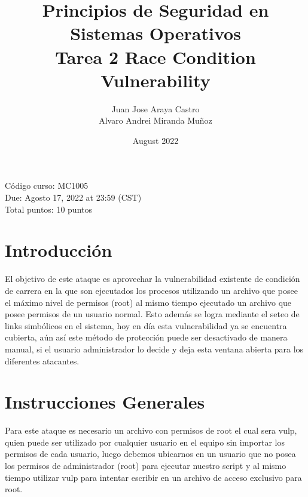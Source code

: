 \documentclass{article}
\title{Principios de Seguridad en Sistemas Operativos \\ Tarea 2 Race Condition Vulnerability}
\author{Juan Jose Araya Castro \\
Alvaro Andrei Miranda Muñoz}
\date{August 2022}
\begin{document}
\maketitle

\begin{minipage}{\textwidth}
Código curso: MC1005\\
Due: Agosto 17, 2022 at 23:59 (CST)\\
Total puntos: 10 puntos\\
\end{minipage}
    
\section*{Introducción}
El objetivo de este ataque es aprovechar la vulnerabilidad existente de condición de carrera en la que son ejecutados los procesos utilizando un archivo que posee el máximo nivel de permisos (root) al mismo tiempo ejecutado un archivo que posee permisos de un usuario normal. Esto además se logra mediante el seteo de links simbólicos en el sistema, hoy en día esta vulnerabilidad ya se encuentra cubierta, aún así este método de protección puede ser desactivado de manera manual, si el usuario administrador lo decide y deja esta ventana abierta para los diferentes atacantes.

\section*{Instrucciones Generales}

Para este ataque es necesario un archivo con permisos de root el cual sera vulp, quien puede ser utilizado por cualquier usuario en el equipo sin importar los permisos de cada usuario, luego debemos ubicarnos en un usuario que no posea los permisos de administrador (root) para ejecutar nuestro script y al mismo tiempo utilizar vulp para intentar escribir en un archivo de acceso exclusivo para root.
\end{document}
